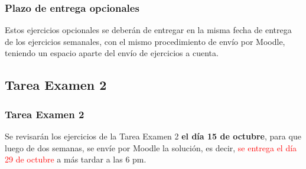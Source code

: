 \documentclass[12pt]{beamer}
\begin{document}
\begin{frame}
\frametitle{Plazo de entrega opcionales}
Estos ejercicios opcionales se deberán de entregar en la misma fecha de entrega de los ejercicios semanales, con el mismo procedimiento de envío por Moodle, teniendo un espacio aparte del envío de ejercicios a cuenta.
\end{frame}

\subsection{Tarea Examen 2}

\begin{frame}
\frametitle{Tarea Examen 2}
Se revisarán los ejercicios de la Tarea Examen 2 \textbf{el día 15 de octubre}, para que luego de dos semanas, se envíe por Moodle la solución, es decir, \textcolor{red}{se entrega el día 29 de octubre} a más tardar a las 6 pm.
\end{frame}
\end{document}
